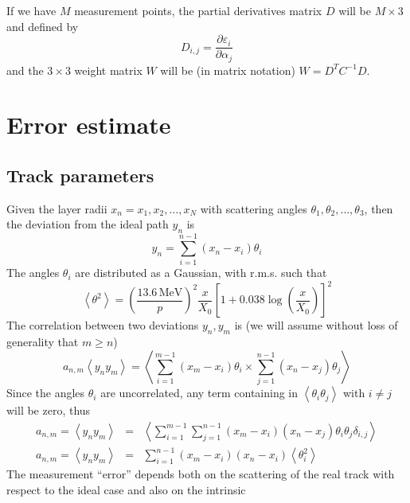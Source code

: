 \documentclass[10pt,a4paper]{article}
\begin{document}
If we have $M$ measurement points, the partial derivatives matrix $D$
will be $M\times 3$ and defined by
\begin{equation}
  D_{i,j} = \frac { \partial \varepsilon_i} {\partial \alpha_j}
\end{equation}
and the $3\times 3$ weight matrix $W$ will be (in matrix notation)
$W=D^{T}C^{-1}D$.
\section{Error estimate}
\subsection{Track parameters}
Given the layer radii $x_n = x_1, x_2, \ldots, x_N$ with scattering
angles $\theta_1, \theta_2, \ldots, \theta_3$, then the deviation from
the ideal path $y_n$ is
\begin{equation}
  y_n=\sum_{i=1}^{n-1} \left (  x_n - x_i \right ) \theta_i
\end{equation}
The angles $\theta_i$ are distributed as a Gaussian, with r.m.s. such
that
\begin{equation}
  \left < \theta^2 \right > =
  \left ( \frac {13.6\,\mathrm{MeV}} {p} \right )^2
  \frac x {X_0}
  \left [ 1+ 0.038 \log \left ( \frac x {X_0} \right ) \right ] ^2
\end{equation}
The correlation between two deviations $y_n, y_m$ is (we will assume
without loss of generality that $m \geq n$)
\begin{equation}
  a_{n,m}\left < y_n y_m \right > =
  \left <
    \sum_{i=1}^{m-1} \left (  x_m - x_i \right ) \theta_i
    \times
    \sum_{j=1}^{n-1} \left (  x_n - x_j \right ) \theta_j
  \right >
\end{equation}
Since the angles $\theta_i$ are uncorrelated, any term containing in
$\left < \theta_i \theta_j \right >$ with $i\neq j$ will be zero, thus
\begin{eqnarray}
  a_{n,m} = \left < y_n y_m \right > & = &
  \left <
    \sum_{i=1}^{m-1} \sum_{j=1}^{n-1}
    \left (  x_m - x_i \right )
    \left (  x_n - x_j \right ) \theta_i \theta_j \delta_{i,j}
  \right > \nonumber \\
  a_{n,m} = \left < y_n y_m \right > & = &
  \sum_{i=1}^{n-1} 
  \left (  x_m - x_i \right )
  \left (  x_n - x_i \right )  \left < \theta_i^2 \right > 
\end{eqnarray}
The measurement ``error'' depends both on the scattering of the real
track with respect to the ideal case and also on the intrinsic
\end{document}
